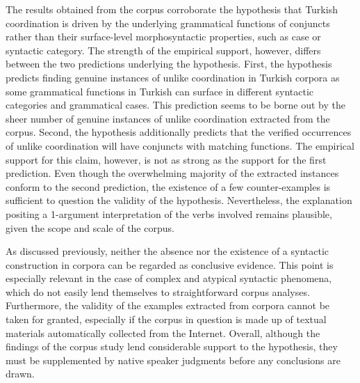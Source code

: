 \begin{sloppypar}
The results obtained from the corpus corroborate the hypothesis that Turkish coordination is driven by the underlying grammatical functions of conjuncts rather than their surface-level morphosyntactic properties, such as case or syntactic category. The strength of the empirical support, however, differs between the two predictions underlying the hypothesis. First, the hypothesis predicts finding genuine instances of unlike coordination in Turkish corpora as some grammatical functions in Turkish can surface in different syntactic categories and grammatical cases. This prediction seems to be borne out by the sheer number of genuine instances of unlike coordination extracted from the corpus. Second, the hypothesis additionally predicts that the verified occurrences of unlike coordination will have conjuncts with matching functions. The empirical support for this claim, however, is not as strong as the support for the first prediction. Even though the overwhelming majority of the extracted instances conform to the second prediction, the existence of a few counter-examples is sufficient to question the validity of the hypothesis. Nevertheless, the explanation positing a 1-argument interpretation of the verbs involved remains plausible, given the scope and scale of the corpus.
\end{sloppypar}

As discussed previously, neither the absence nor the existence of a syntactic construction in corpora can be regarded as conclusive evidence. This point is especially relevant in the case of complex and atypical syntactic phenomena, which do not easily lend themselves to straightforward corpus analyses. Furthermore, the validity of the examples extracted from corpora cannot be taken for granted, especially if the corpus in question is made up of textual materials automatically collected from the Internet. Overall, although the findings of the corpus study lend considerable support to the hypothesis, they must be supplemented by native speaker judgments before any conclusions are drawn.